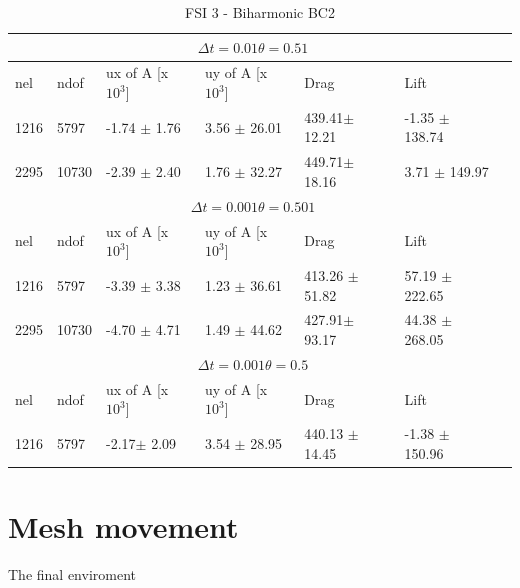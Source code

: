 \begin{table}[h!]
\centering
\caption{FSI 3 - Biharmonic BC2}
\label{my-label}
\begin{tabular}{ |p{1cm}||p{1cm}|p{2.5cm}|p{2.5cm}|p{2.7cm}|p{2.7cm}|p{1.2cm}|}
 \hline
  \multicolumn{6}{|c|}{$\Delta t = 0.01 \theta = 0.51$} \\
   \hline
nel & ndof & ux of A [x $10^{3}$]  &uy of A [x $10^{3}$]& Drag  & Lift \\
 \hline
1216 &5797& -1.74  $\pm$  1.76 & 3.56 $\pm$  26.01 & 439.41$\pm$ 12.21  & -1.35    $\pm$  138.74\\
2295 &10730 & -2.39   $\pm$  2.40 &  1.76  $\pm$  32.27 & 449.71$\pm$ 18.16 &  3.71   $\pm$  149.97\\
 \hline
  \multicolumn{6}{|c|}{$\Delta t = 0.001 \theta = 0.501$} \\
   \hline
 nel & ndof & ux of A [x $10^{3}$]  &uy of A [x $10^{3}$]& Drag  & Lift \\
 1216 &5797& -3.39   $\pm$  3.38 &   1.23   $\pm$  36.61 &   413.26 $\pm$  51.82  &   57.19  $\pm$  222.65\\
 2295 &10730& -4.70  $\pm$  4.71& 1.49       $\pm$  44.62& 427.91$\pm$  93.17 &  44.38  $\pm$  268.05 \\
\hline
\multicolumn{6}{|c|}{$\Delta t = 0.001 \theta = 0.5$} \\
   \hline
 nel & ndof & ux of A [x $10^{3}$]  &uy of A [x $10^{3}$]& Drag  & Lift \\
\hline
1216 &5797&-2.17$\pm$  2.09 & 3.54  $\pm$  28.95 & 440.13  $\pm$  14.45  &  -1.38  $\pm$  150.96\\
\hline
\end{tabular}
\end{table}


\section{Mesh movement}
The final enviroment
